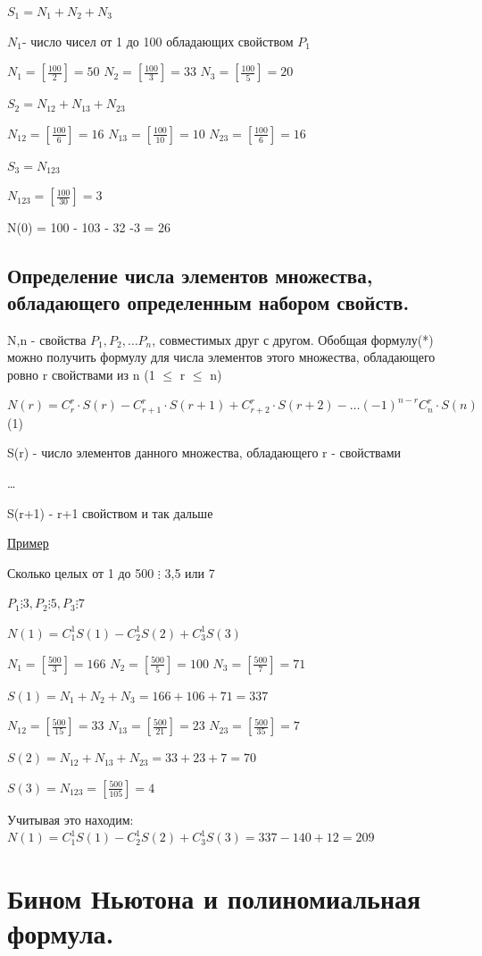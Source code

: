 \documentclass[12pt, a4paper, oneside]{article}
\theoremstyle{plain} %
\theoremstyle{definition}
\begin{document}
$S_1 = N_1 + N_2 + N_3$

$N_1 $- число чисел от 1 до 100 обладающих свойством $P_1$



$N_1 = [\frac{100}{2}]=50$
$N_2 = [\frac{100}{3}]=33$
$N_3 = [\frac{100}{5}]=20$

$S_2 = N_12 + N_13 + N_23$

$N_12 =[\frac{100}{6}]=16$ 
$N_13 =[\frac{100}{10}]=10$
$N_23 =[\frac{100}{6}]=16$

$S_3 = N_123$

$N_123 = [\frac{100}{30}] = 3$

N(0) = 100 - 103 - 32 -3 = 26
\subsection{Определение числа элементов множества, обладающего определенным набором свойств.}

N,n - свойства $P_1,P_2,\dots P_n$, совместимых друг с другом. Обобщая формулу(*) можно получить формулу для числа элементов этого множества, обладающего ровно r свойствами из n (1 $\leq$ r $\leq$ n)

$N(r)= C_r^r \cdot S(r) - C_{r+1}^r \cdot S(r+1) + C_{r+2}^r \cdot S(r+2)- \dots (-1)^{n-r} C_n^r \cdot S(n)$ (1)

S(r) - число элементов данного множества, обладающего r - свойствами

\dots

S(r+1) - r+1 свойством и так дальше

\underline{Пример}

Сколько целых от 1 до 500 $\vdots$ 3,5 или 7

$P_1 \vdots 3, P_2 \vdots 5, P_3 \vdots 7$

$N(1) = C_1^1 S(1) - C_2^1 S(2) + C_3^1 S(3)$ 

$N_1 = [\frac{500}{3}] = 166$
$N_2 = [\frac{500}{5}] = 100$
$N_3 = [\frac{500}{7}] = 71$

$S(1) = N_1 + N_2 + N_3 = 166 + 106 + 71 = 337$

$N_{12}= [\frac{500}{15}]=33$
$N_{13}= [\frac{500}{21}]=23$
$N_{23}= [\frac{500}{35}]=7$

$S(2) = N_{12} + N_{13} + N_{23}= 33 + 23 + 7 = 70$ 


$S(3) = N_{123} = [\frac{500}{105}] = 4$

Учитывая это находим: $N(1) = C_1^1 S(1) - C_2^1 S(2) + C_3^1 S(3) = 337 - 140 + 12 = 209$

\section{Бином Ньютона и полиномиальная формула.}
\end{document}
